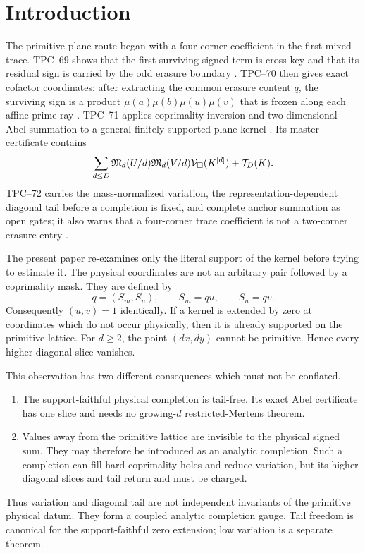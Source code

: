 \section{Introduction}
\label{sec:introduction}

The primitive-plane route began with a four-corner coefficient in the first
mixed trace.  TPC--69 shows that the first surviving signed term is
cross-key and that its residual sign is carried by the odd erasure
boundary \citep{WangTPC69}.  TPC--70 then gives exact cofactor coordinates:
after extracting the common erasure content \(q\), the surviving sign is a
product \(\mu(a)\mu(b)\mu(u)\mu(v)\) that is frozen along each affine prime
ray \citep{WangTPC70}.  TPC--71 applies coprimality inversion and
two-dimensional Abel summation to a general finitely supported plane kernel
\citep{WangTPC71}.  Its master certificate contains
\[
 \sum_{d\le D}
 \mathfrak M_d(U/d)\mathfrak M_d(V/d)
 \mathcal V_\square(K^{[d]})
 +
 \mathcal T_D(K).
\]
TPC--72 carries the mass-normalized variation, the representation-dependent
diagonal tail before a completion is fixed, and complete anchor summation
as open gates; it also warns that a four-corner trace coefficient is not a
two-corner erasure entry
\citep{WangTPC72}.

The present paper re-examines only the literal support of the kernel before
trying to estimate it.  The physical coordinates are not an arbitrary pair
followed by a coprimality mask.  They are defined by
\[
 q=(S_m,S_n),\qquad S_m=qu,\qquad S_n=qv.
\]
Consequently \((u,v)=1\) identically.  If a kernel is extended by zero at
coordinates which do not occur physically, then it is already supported on
the primitive lattice.  For \(d\ge2\), the point \((dx,dy)\) cannot be
primitive.  Hence every higher diagonal slice vanishes.

This observation has two different consequences which must not be
conflated.
\begin{enumerate}[label=\textup{(\roman*)},leftmargin=3em]
 \item The support-faithful physical completion is tail-free.  Its exact
       Abel certificate has one slice and needs no growing-\(d\)
       restricted-Mertens theorem.
 \item Values away from the primitive lattice are invisible to the
       physical signed sum.  They may therefore be introduced as an
       analytic completion.  Such a completion can fill hard coprimality
       holes and reduce variation, but its higher diagonal slices and tail
       return and must be charged.
\end{enumerate}
Thus variation and diagonal tail are not independent invariants of the
primitive physical datum.  They form a coupled analytic completion gauge.
Tail freedom is canonical for the support-faithful zero extension; low
variation is a separate theorem.

